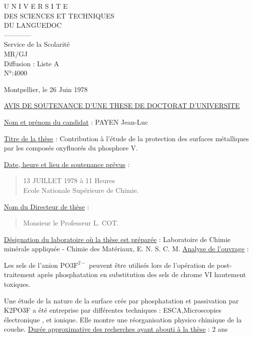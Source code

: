 \begin{center}U N I V E R S I T E\\DES SCIENCES ET TECHNIQUES\\DU LANGUEDOC\\------------\\Service de la Scolarité\\MR/GJ\\Diffusion : Liste A\\N°:4000\end{center}
\begin{flushright}Montpellier, le 26 Juin 1978\end{flushright}
\begin{center}\uline{AVIS DE SOUTENANCE D'UNE THESE DE DOCTORAT D'UNIVERSITE}\end{center}
\uline{Nom et prénom du candidat} : PAYEN Jean-Luc

\uline{Titre de la thèse} : Contribution à l'étude de la protection des surfaces métalliques par les composés oxyfluorés du phosphore V.

\uline{Date, heure et lieu de soutenance prévus} :
\begin{quote}13 JUILLET 1978 à 11 Heures\\Ecole Nationale Supérieure de Chimie.\end{quote}
\uline{Nom du Directeur de thèse} :
\begin{quote}Monsieur le Professeur L. COT.\end{quote}
\uline{Désignation du laboratoire où la thèse est préparée} :
Laboratoire de Chimie minérale appliquée - Chimie des Matériaux, E. N. S. C. M.
\uline{Analyse de l'ouvrage} :

Les sels de l'anion $\mathrm{PO3F}^{2-}$ peuvent être utilisés lors de l'opération de post-traitement après phosphatation en substitution des sels de chrome VI hautement toxiques.

Une étude de la nature de la surface crée par phosphatation et passivation par K2PO3F a été entreprise par différentes techniques : ESCA,Microscopies électronique , et ionique. Elle montre une réorganisation physico chimique de la couche.
\uline{Durée approximative des recherches ayant abouti à la thèse} : 2 ans


